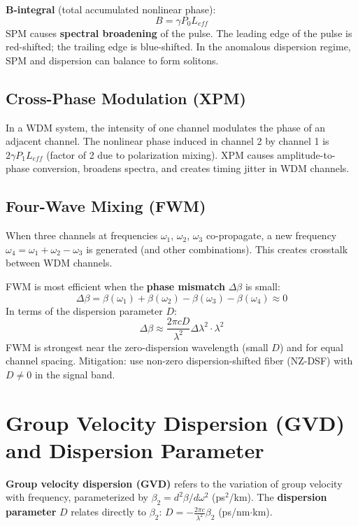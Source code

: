 \documentclass[12pt,a4paper]{article}
\begin{document}
\textbf{B-integral} (total accumulated nonlinear phase):
\[
B = \gamma P_0 L_{eff}
\]
SPM causes \textbf{spectral broadening} of the pulse. The leading edge of the pulse is red-shifted; the trailing edge is blue-shifted. In the anomalous dispersion regime, SPM and dispersion can balance to form solitons.

\subsection{Cross-Phase Modulation (XPM)}
In a WDM system, the intensity of one channel modulates the phase of an adjacent channel. The nonlinear phase induced in channel 2 by channel 1 is $2\gamma P_1 L_{eff}$ (factor of 2 due to polarization mixing). XPM causes amplitude-to-phase conversion, broadens spectra, and creates timing jitter in WDM channels.

\subsection{Four-Wave Mixing (FWM)}
When three channels at frequencies $\omega_1$, $\omega_2$, $\omega_3$ co-propagate, a new frequency $\omega_4 = \omega_1 + \omega_2 - \omega_3$ is generated (and other combinations). This creates crosstalk between WDM channels.

\begin{tcolorbox}[formulabox, title={\textbf{FWM Phase Matching Condition}}]
FWM is most efficient when the \textbf{phase mismatch} $\Delta\beta$ is small:
\[
\Delta\beta = \beta(\omega_1) + \beta(\omega_2) - \beta(\omega_3) - \beta(\omega_4) \approx 0
\]
In terms of the dispersion parameter $D$:
\[
\Delta\beta \approx \frac{2\pi c D}{\lambda^2} \Delta\lambda^2 \cdot \lambda^2
\]
FWM is strongest near the zero-dispersion wavelength (small $D$) and for equal channel spacing. Mitigation: use non-zero dispersion-shifted fiber (NZ-DSF) with $D \neq 0$ in the signal band.
\end{tcolorbox}

\section{Group Velocity Dispersion (GVD) and Dispersion Parameter}

\begin{tcolorbox}[defbox, title={\textbf{GVD and Dispersion Parameter $D$}}]
\textbf{Group velocity dispersion (GVD)} refers to the variation of group velocity with frequency, parameterized by $\beta_2 = d^2\beta/d\omega^2$ (ps$^2$/km). The \textbf{dispersion parameter} $D$ relates directly to $\beta_2$:
$D = -\frac{2\pi c}{\lambda^2}\beta_2$ \quad (ps/nm$\cdot$km).
\end{tcolorbox}
\end{document}
